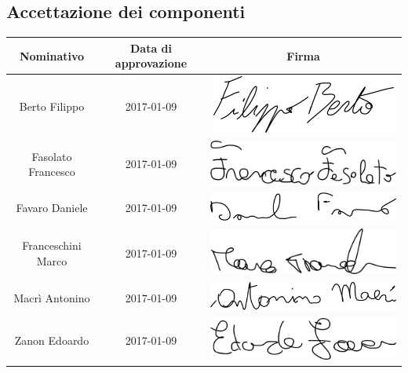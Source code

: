 \documentclass[../PianoDiProgetto_v3.0.0.tex]{subfiles}
\begin{document}
\vfill	
\newpage
\vfill

	\subsection{Accettazione dei componenti}
	
		\begin{table}[h]
	
		\begin{tabularx}{\textwidth}{C C C}
			\toprule
			\textbf{Nominativo} & \textbf{Data di approvazione} & \textbf{Firma} \\
			\midrule
			Berto Filippo & 2017-01-09 & \includegraphics[scale=0.4]{Firme/fberto_firma} \\[1.2ex]
			Fasolato Francesco & 2017-01-09 & \includegraphics[scale=0.3]{Firme/ffasolato_firma} \\[1.2ex]
			Favaro Daniele & 2017-01-09 & \includegraphics[scale=0.3]{Firme/dfavaro_firma} \\[1.2ex]
			Franceschini Marco & 2017-01-09 &	\includegraphics[scale=0.4]{Firme/mfrances_firma} \\[1.2ex]
			Macrì Antonino & 2017-01-09 & \includegraphics[scale=0.3]{Firme/amacri_firma} \\[1.2ex]
			Zanon Edoardo & 2017-01-09 & \includegraphics[scale=0.3]{Firme/ezanon_firma} \\[1.2ex]

\end{tabularx}
\end{table}
\end{document}
